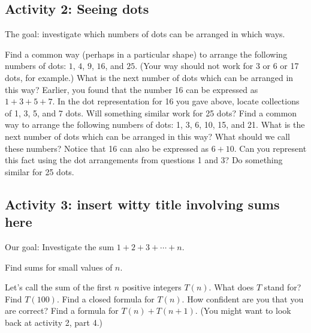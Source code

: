 \documentclass[11pt]{exam}
\begin{document}
\newpage
\subsection*{Activity 2: Seeing dots}
The goal: investigate which numbers of dots can be arranged in which ways.

\begin{questions}
  \question Find a common way (perhaps in a particular shape) to arrange  the following numbers of dots: $1$, $4$, $9$, $16$, and $25$.  (Your way should not work for 3 or 6 or 17 dots, for example.)  What is the next number of dots which can be arranged in this way?
  \vfill
  \question Earlier, you found that the number 16 can be expressed as $1 + 3 + 5 + 7$.  In the dot representation for 16 you gave above, locate collections of 1, 3, 5, and 7 dots.  Will something similar work for 25 dots?
  \vfill
  \question Find a common way to arrange the following numbers of dots: 1, 3, 6, 10, 15, and 21.  What is the next number of dots which can be arranged in this way?  What should we call these numbers?
  \vfill
  \question Notice that 16 can also be expressed as $6 + 10$.  Can you represent this fact using the dot arrangements from questions 1 and 3?  Do something similar for 25 dots.
  \vfill

\end{questions}

\newpage
\subsection*{Activity 3: \textlangle insert witty title involving sums here\textrangle}
Our goal: Investigate the sum $1 + 2 + 3 + \cdots + n$.
\begin{questions}
  \question Find sums for small values of $n$.
  \question Let's call the sum of the first $n$ positive integers $T(n)$.  What does $T$ stand for?
  \vfill
  \question Find $T(100)$.
  \vfill
  \question Find a closed formula for $T(n)$.  How confident are you that you are correct?
  \vfill
  \vfill
  \vfill
  \question Find a formula for $T(n) + T(n+1)$.  (You might want to look back at activity 2, part 4.)
  \vfill
\end{questions}
\end{document}
